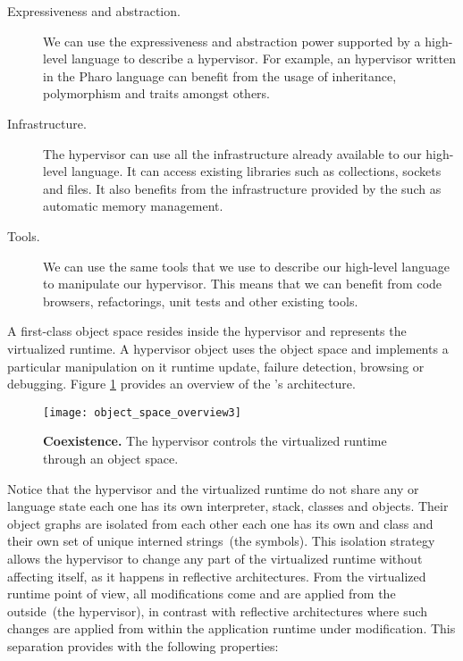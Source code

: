 \begin{description}
\item[Expressiveness and abstraction.] We can use the expressiveness and abstraction power supported by a high-level language to describe a hypervisor. For example, an hypervisor written in the Pharo language can benefit from the usage of inheritance, polymorphism and traits amongst others.
\item[Infrastructure.] The hypervisor can use all the infrastructure already available to our high-level language. It can access existing libraries such as collections, sockets and files. It also benefits from the infrastructure provided by the \VM such as automatic memory management.
\item[Tools.] We can use the same tools that we use to describe our high-level language to manipulate our hypervisor. This means that we can benefit from code browsers, refactorings, unit tests and other existing tools.
\end{description}


A first-class object space resides inside the hypervisor and represents the virtualized runtime. A hypervisor object uses the object space and implements a particular manipulation on it \eg runtime update, failure detection, browsing or debugging. Figure \ref{fig:objectSpaceOverview_architecture} provides an overview of the \Vtt's architecture.

\begin{figure}[ht]
\begin{center}
\texttt{[image: object\_space\_overview3]}
\caption{\textbf{\VTT Coexistence.} The hypervisor controls the virtualized runtime through an object space.\label{fig:objectSpaceOverview_architecture}}
\end{center}
\end{figure}


Notice that the hypervisor and the virtualized runtime do not share any \VM or language state \ie each one has its own interpreter, stack, classes and objects. Their object graphs are isolated from each other \eg each one has its own  and  class and their own set of unique interned strings~(the symbols). This isolation strategy allows the hypervisor to change any part of the virtualized runtime without affecting itself, as it happens in reflective architectures. From the virtualized runtime point of view, all modifications come and are applied from the outside~(the hypervisor), in contrast with reflective architectures where such changes are applied from within the application runtime under modification. This separation provides \Vtt with the following properties:

